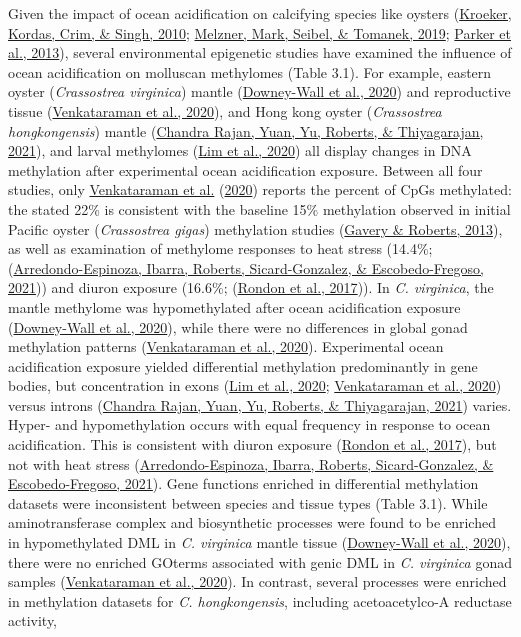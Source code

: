 \documentclass [11pt, proquest] {uwthesis}[2015/03/03]
\begin{document}
Given the impact of ocean acidification on calcifying species like oysters (\protect\hyperlink{ref-Kroeker2010}{Kroeker, Kordas, Crim, \& Singh, 2010}; \protect\hyperlink{ref-Melzner2019}{Melzner, Mark, Seibel, \& Tomanek, 2019}; \protect\hyperlink{ref-Parker2013}{Parker et al., 2013}), several environmental epigenetic studies have examined the influence of ocean acidification on molluscan methylomes (Table 3.1). For example, eastern oyster (\emph{Crassostrea virginica}) mantle (\protect\hyperlink{ref-Downey-Wall2020}{Downey-Wall et al., 2020}) and reproductive tissue (\protect\hyperlink{ref-Venkataraman2020}{Venkataraman et al., 2020}), and Hong kong oyster (\emph{Crassostrea hongkongensis}) mantle (\protect\hyperlink{ref-ChandraRajan2021}{Chandra Rajan, Yuan, Yu, Roberts, \& Thiyagarajan, 2021}), and larval methylomes (\protect\hyperlink{ref-Lim2020}{Lim et al., 2020}) all display changes in DNA methylation after experimental ocean acidification exposure. Between all four studies, only \protect\hyperlink{ref-Venkataraman2020}{Venkataraman et al.} (\protect\hyperlink{ref-Venkataraman2020}{2020}) reports the percent of CpGs methylated: the stated 22\% is consistent with the baseline 15\% methylation observed in initial Pacific oyster (\emph{Crassostrea gigas}) methylation studies (\protect\hyperlink{ref-Gavery2013}{Gavery \& Roberts, 2013}), as well as examination of methylome responses to heat stress (14.4\%; (\protect\hyperlink{ref-Arredondo-Espinoza2021}{Arredondo-Espinoza, Ibarra, Roberts, Sicard-Gonzalez, \& Escobedo-Fregoso, 2021})) and diuron exposure (16.6\%; (\protect\hyperlink{ref-Rondon2017}{Rondon et al., 2017})). In \emph{C. virginica}, the mantle methylome was hypomethylated after ocean acidification exposure (\protect\hyperlink{ref-Downey-Wall2020}{Downey-Wall et al., 2020}), while there were no differences in global gonad methylation patterns (\protect\hyperlink{ref-Venkataraman2020}{Venkataraman et al., 2020}). Experimental ocean acidification exposure yielded differential methylation predominantly in gene bodies, but concentration in exons (\protect\hyperlink{ref-Lim2020}{Lim et al., 2020}; \protect\hyperlink{ref-Venkataraman2020}{Venkataraman et al., 2020}) versus introns (\protect\hyperlink{ref-ChandraRajan2021}{Chandra Rajan, Yuan, Yu, Roberts, \& Thiyagarajan, 2021}) varies. Hyper- and hypomethylation occurs with equal frequency in response to ocean acidification. This is consistent with diuron exposure (\protect\hyperlink{ref-Rondon2017}{Rondon et al., 2017}), but not with heat stress (\protect\hyperlink{ref-Arredondo-Espinoza2021}{Arredondo-Espinoza, Ibarra, Roberts, Sicard-Gonzalez, \& Escobedo-Fregoso, 2021}). Gene functions enriched in differential methylation datasets were inconsistent between species and tissue types (Table 3.1). While aminotransferase complex and biosynthetic processes were found to be enriched in hypomethylated DML in \emph{C. virginica} mantle tissue (\protect\hyperlink{ref-Downey-Wall2020}{Downey-Wall et al., 2020}), there were no enriched GOterms associated with genic DML in \emph{C. virginica} gonad samples (\protect\hyperlink{ref-Venkataraman2020}{Venkataraman et al., 2020}). In contrast, several processes were enriched in methylation datasets for \emph{C. hongkongensis}, including acetoacetylco-A reductase activity, 
\end{document}
